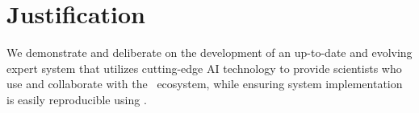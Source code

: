 \section{Justification}
We demonstrate and deliberate on the development of an up-to-date and evolving expert system that utilizes cutting-edge AI technology to provide scientists who use and collaborate with the \GN\ ecosystem, while ensuring system implementation is easily reproducible using \guix.